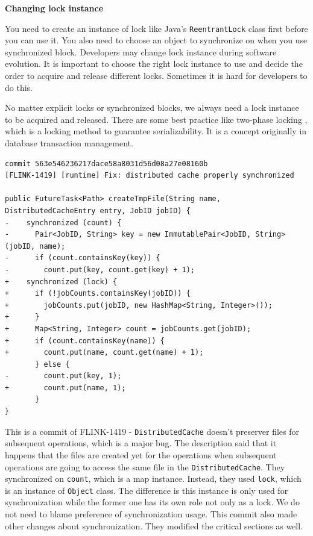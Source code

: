 \documentclass[conference]{IEEEtran}
\begin{document}
\textbf{Changing lock instance}

You need to create an instance of lock like Java's \texttt{ReentrantLock} class first before you can use it. You also need to choose an object to synchronize on when you use synchronized block. Developers may change lock instance during software evolution. It is important to choose the right lock instance to use and decide the order to acquire and release different locks. Sometimes it is hard for developers to do this.

No matter explicit locks or synchronized blocks, we always need a lock instance to be acquired and released.  There are some best practice like two-phase locking \cite{journals/cacm/EswarranGLT76}, which is a locking method to guarantee serializability. It is a concept originally in database transaction management. %

\begin{lstlisting}
commit 563e546236217dace58a8031d56d08a27e08160b
[FLINK-1419] [runtime] Fix: distributed cache properly synchronized

public FutureTask<Path> createTmpFile(String name, DistributedCacheEntry entry, JobID jobID) {
-    synchronized (count) {
-      Pair<JobID, String> key = new ImmutablePair<JobID, String>(jobID, name);
-      if (count.containsKey(key)) {
-        count.put(key, count.get(key) + 1);
+    synchronized (lock) {
+      if (!jobCounts.containsKey(jobID)) {
+        jobCounts.put(jobID, new HashMap<String, Integer>());
+      }
+      Map<String, Integer> count = jobCounts.get(jobID);
+      if (count.containsKey(name)) {
+        count.put(name, count.get(name) + 1);
       } else {
-        count.put(key, 1);
+        count.put(name, 1);
       }
}
\end{lstlisting}

This is a commit of FLINK-1419 - \texttt{DistributedCache} doesn't preserver files for subsequent operations, which is a major bug. The description said that it happens that the files are created yet for the operations when subsequent operations are going to access the same file in the \texttt{DistributedCache}. They synchronized on \texttt{count}, which is a map instance. Instead, they used \texttt{lock}, which is an instance of \texttt{Object} class. The difference is this instance is only used for synchronization while the former one has its own role not only as a lock. We do not need to blame preference of synchronization usage. This commit also made other changes about synchronization. They modified the critical sections as well.
\end{document}
